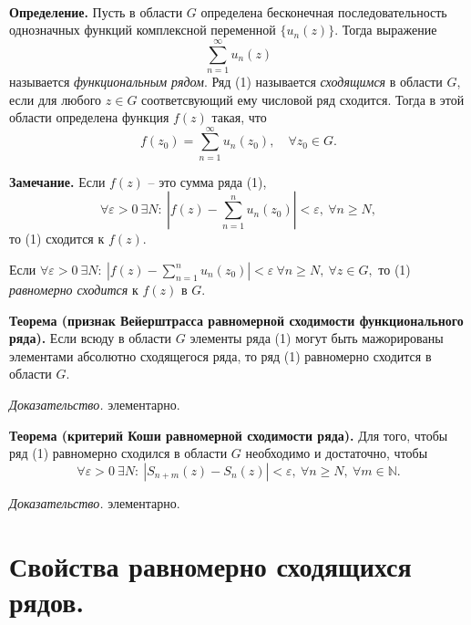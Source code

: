 \documentclass[9pt]{article}
\begin{document}
\ 
\par\textbf{Определение.} Пусть в области \(G\) определена бесконечная последовательность однозначных функций комплексной переменной \(\{u_n(z)\}\). Тогда выражение 
\begin{equation}
    \sum_{n=1}^\infty u_n(z)
\end{equation}называется \textit{функциональным рядом}. Ряд (1) называется \textit{сходящимся} в области \(G\), если для любого \(z\in G\) соответсвующий ему числовой ряд сходится. Тогда в этой области определена функция \(f(z)\) такая, что
\[f(z_0)=\displaystyle\sum_{n=1}^\infty u_n(z_0),\quad\forall z_0\in G.\]
\par\textbf{Замечание.} Если \(f(z)\) -- это сумма ряда (1), 
\[\forall\varepsilon>0\ \exists N:\ |f(z)-\displaystyle\sum_{n=1}^n u_n(z_0)|<\varepsilon,\ \forall n\ge N,\]
то (1) сходится к \(f(z)\).
\par\textbf{}Если \(\forall\varepsilon>0\ \exists N:\ |f(z)-\displaystyle\sum_{n=1}^n u_n(z_0)|<\varepsilon\ \forall n\ge N,\ \forall z\in G,\)
то (1) \textit{равномерно сходится} к \(f(z)\) в \(G\).
\par\textbf{Теорема (признак Вейерштрасса равномерной сходимости функционального ряда).} Если всюду в области \(G\) элементы ряда (1) могут быть мажорированы элементами абсолютно сходящегося ряда, то ряд (1) равномерно сходится в области \(G\).
\par\textit{Доказательство.} элементарно.
\par\textbf{Теорема (критерий Коши равномерной сходимости ряда).} Для того, чтобы ряд (1) равномерно сходился в области \(G\) необходимо и достаточно, чтобы \[\forall\varepsilon>0\ \exists N:\ |S_{n+m}(z)-S_n(z)|<\varepsilon,\ \forall n\ge N,\ \forall m\in\mathbb N.\]
\par\textit{Доказательство.} элементарно.

\section{Свойства равномерно сходящихся рядов.}
\end{document}
